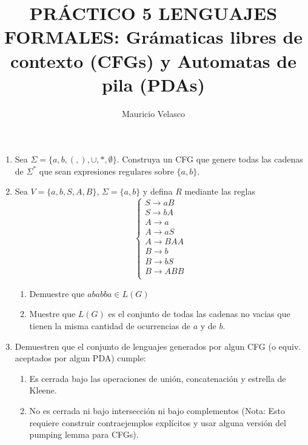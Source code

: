 \documentclass[12pt, a4paper]{article}
\date{}
\begin{document}
\title{PRÁCTICO 5 LENGUAJES FORMALES: Grámaticas libres de contexto (CFGs) y Automatas de pila (PDAs)}
\author{Mauricio Velasco}
\maketitle{}

\begin{enumerate} 

\item Sea $\Sigma=\{a,b,(,),\cup,*,\emptyset\}$. Construya un CFG que genere todas las cadenas de $\Sigma^*$ que sean expresiones regulares sobre $\{a,b\}$.

\item Sea $V=\{a,b,S,A,B\}$, $\Sigma =\{a,b\}$ y defina $R$ mediante las reglas 
\[
\begin{cases}
S\rightarrow aB\\
S\rightarrow bA\\
A\rightarrow a\\
A\rightarrow aS\\
A\rightarrow BAA\\
B\rightarrow b\\
B\rightarrow bS\\
B\rightarrow ABB\\
\end{cases}
\]
\begin{enumerate}
\item Demuestre que $ababba\in L(G)$ 
\item Muestre que $L(G)$ es el conjunto de todas las cadenas no vacias que tienen la misma cantidad de ocurrencias de $a$ y de $b$.
\end{enumerate}

\item Demuestren que el conjunto de lenguajes generados por algun CFG (o equiv. aceptados por algun PDA) cumple:
\begin{enumerate}
\item Es cerrada bajo las operaciones de unión, concatenación y estrella de Kleene.
\item No es cerrada ni bajo intersección ni bajo complementos (Nota: Esto requiere construir contraejemplos explícitos y usar alguna versión del pumping lemma para CFGs).
\end{enumerate}





\end{enumerate}
\end{document}
